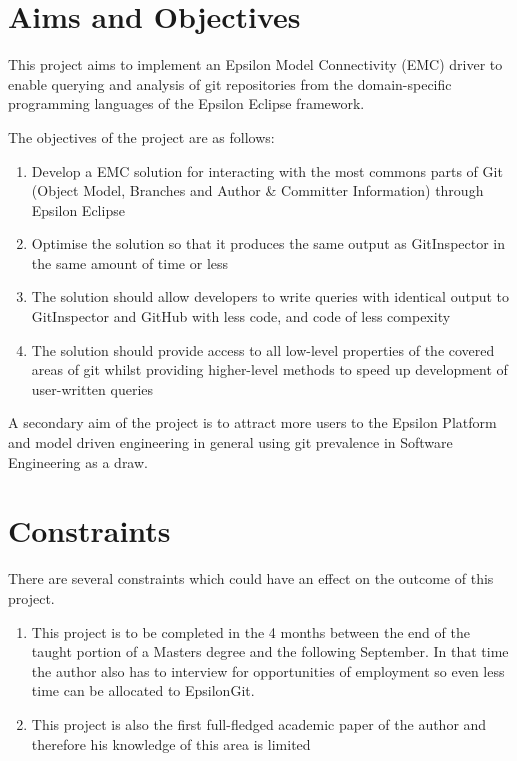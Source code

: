 \documentclass[11pt]{book}
\begin{document}
\section{Aims and Objectives}
\label{aimsandobjectives} 
This project aims to implement an Epsilon Model Connectivity (EMC) driver to enable querying and analysis of git repositories from the domain-specific programming languages of the Epsilon Eclipse framework.

The objectives of the project are as follows:

\begin{enumerate}
	\item Develop a EMC solution for interacting with the most commons parts of Git (Object Model, Branches and Author \& Committer Information) through Epsilon Eclipse
	\item Optimise the solution so that it produces the same output as GitInspector in the same amount of time or less 
	\item The solution should allow developers to write queries with identical output to GitInspector and GitHub with less code, and code of less compexity
	\item The solution should provide access to all low-level properties of the covered areas of git whilst providing higher-level methods to speed up development of user-written queries
\end{enumerate}

A secondary aim of the project is to attract more users to the Epsilon Platform and model driven engineering in general using git prevalence in Software Engineering as a draw.

\section{Constraints}
\label{constaints}
There are several constraints which could have an effect on the outcome of this project. 

\begin{enumerate}
	\item This project is to be completed in the 4 months between the end of the taught portion of a Masters degree and the following September. In that time the author also has to interview for opportunities of employment so even less time can be allocated to EpsilonGit.
	\item This project is also the first full-fledged academic paper of the author and therefore his knowledge of this area is limited
\end{enumerate}
\end{document}
